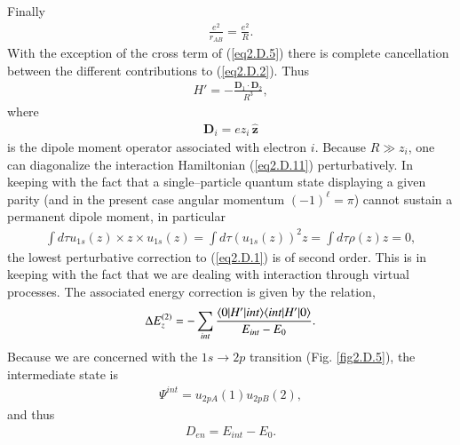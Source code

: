 \begin{subappendices}
Finally
\begin{align}\label{eq2.D.10}
\frac{e^2}{r_{AB}}=\frac{e^2}{R}.
\end{align}
With the exception of the cross term of (\ref{eq2.D.5}) there is complete cancellation between the different contributions to (\ref{eq2.D.2}). Thus
\begin{align}\label{eq2.D.11}
H'=-\frac{\mathbf D_1\cdot\mathbf D_2}{R^3},
\end{align} 
where
\begin{align}\label{eq2.D.12}
\mathbf D_i=ez_i\,\hat {\mathbf{z}}
\end{align} 
is the dipole moment operator associated with electron $i$. Because $R\gg z_i$, one can diagonalize the interaction Hamiltonian (\ref{eq2.D.11}) perturbatively. In keeping with the fact that   a single--particle quantum state displaying a given parity (and in the present case angular momentum $(-1)^\ell=\pi$) cannot sustain a permanent dipole moment, in particular
\begin{align}\label{eq2.D.13}
\int d\tau u_{1s}(z)\times z\times u_{1s}(z)=\int d\tau (u_{1s}(z))^2z=\int d\tau \rho(z)z=0,
\end{align} 
 the lowest perturbative correction to (\ref{eq2.D.1}) is of second order. This is in keeping with the fact that we are dealing with interaction through virtual processes. The associated energy correction is given by the relation,
 \begin{align}\label{eq2.D.14}
\Delta E_z^{(2)}=-\sum_{int}\frac{\langle {0|H'|int} \rangle\langle {int|H'|0} \rangle}{E_{int}-E_0}.
 \end{align} 
 Because we are concerned with the $1s\to 2p$ transition (Fig. \ref{fig2.D.5}), the intermediate state is
  \begin{align}\label{eq2.D.15}
\Psi^{int}=u_{2pA}(1)u_{2pB}(2),
  \end{align} 
 and thus
  \begin{align}\label{eq2.D.16}
D_{en}=E_{int}-E_0.
   \end{align} 
   

\end{subappendices}
